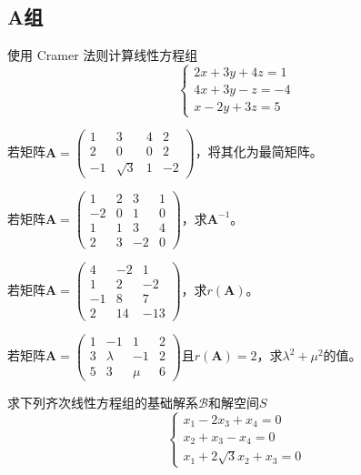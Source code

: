 \subsection{A组}

\begin{reidai}
	使用 Cramer 法则计算线性方程组$$\left\{\begin{matrix} 
		2x+3y+4z=1 \\  
		4x+3y-z=-4 \\
		x-2y+3z=5
	  \end{matrix}\right. $$
\end{reidai}

\begin{reidai}
	若矩阵$\mathbf{A}=\begin{pmatrix}
		1 & 3 & 4 & 2\\
		2 & 0 & 0 & 2\\
		-1 & \sqrt{3} & 1 & -2
	\end{pmatrix}$，将其化为最简矩阵。
\end{reidai}

\begin{reidai}
	若矩阵$\mathbf{A}=\begin{pmatrix}
		1 & 2 & 3 & 1\\
		-2 & 0 & 1 & 0\\
		1 & 1 & 3 & 4\\
		2 & 3 & -2 & 0
	   \end{pmatrix}$，求$\mathbf{A}^{-1}$。
\end{reidai}

\begin{reidai}
	若矩阵$\mathbf{A}=\begin{pmatrix}
		4 & -2 & 1 \\
		1 & 2 & -2 \\
		-1 & 8 & 7 \\
		2 & 14 & -13
	   \end{pmatrix}$，求$r(\mathbf{A})$。
\end{reidai}

\begin{reidai}
	若矩阵$\mathbf{A}=\begin{pmatrix}
		1 & -1 & 1 & 2\\
		3 & \lambda & -1 & 2\\
		5 & 3 & \mu & 6
	   \end{pmatrix}$且$r(\mathbf{A})=2$，求$\lambda^2+\mu^2$的值。
\end{reidai}

\begin{reidai}
	求下列齐次线性方程组的基础解系$\mathcal{B}$和解空间$S$
	$$
	\left\{\begin{matrix} 
		x_1-2x_3+x_4=0 \\  
		x_2+x_3-x_4= 0 \\
		x_1+2\sqrt{3}x_2+x_3=0
	  \end{matrix}\right. 
	$$
\end{reidai}

